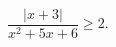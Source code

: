 \begin{ex}[type=inequality]
	\begin{condition}
		$ \dfrac{|x + 3|}{x^2 + 5x + 6}\geqslant2.$
	\end{condition}
\end{ex}